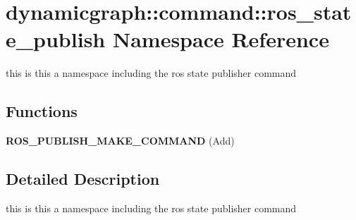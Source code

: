 \hypertarget{namespacedynamicgraph_1_1command_1_1ros__state__publish}{}\section{dynamicgraph\+:\+:command\+:\+:ros\+\_\+state\+\_\+publish Namespace Reference}
\label{namespacedynamicgraph_1_1command_1_1ros__state__publish}


this is this a namespace including the ros state publisher command  


\subsection*{Functions}
\begin{DoxyCompactItemize}
\item 
{\bfseries R\+O\+S\+\_\+\+P\+U\+B\+L\+I\+S\+H\+\_\+\+M\+A\+K\+E\+\_\+\+C\+O\+M\+M\+A\+ND} (Add)\hypertarget{namespacedynamicgraph_1_1command_1_1ros__state__publish_afda3d72cc97dc1e2e41f454faa40f814}{}\label{namespacedynamicgraph_1_1command_1_1ros__state__publish_afda3d72cc97dc1e2e41f454faa40f814}

\end{DoxyCompactItemize}


\subsection{Detailed Description}
this is this a namespace including the ros state publisher command 